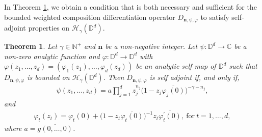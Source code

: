 \documentclass[12pt, reqno]{amsart}
\newtheorem{theorem}{Theorem}[section]
\theoremstyle{definition}
\theoremstyle{remark}
\numberwithin{equation}{section}
\newcommand{\mfn}{\mathbf n}
\begin{document}
 
 In Theorem \ref{Thm_2}, we obtain a condition that is both necessary and sufficient for the bounded weighted composition differentiation operator $D_{\mfn,\psi,\varphi}$ to satisfy self-adjoint properties on  $\mathcal{H}_\gamma(\mathbb{D}^d)$.
 \begin{theorem}\label{Thm_2}
 	Let $\gamma\in \mathbb{N}^+$ and $\mfn$ be a non-negative integer. Let $\psi: \mathbb{D}^d\longrightarrow \mathbb{C}$ be a non-zero analytic function and $\varphi: \mathbb{D}^d\longrightarrow \mathbb{D}^d$ with $\varphi(z_1,  \dots, z_d)=(\varphi_1(z_1), \dots, \varphi_d(z_d))$ be an analytic self map of $\mathbb{D}^d$ such that $D_{\mfn,\psi,\varphi}$ is bounded on $\mathcal{H}_\gamma(\mathbb{D}^d)$.
 	Then $D_{\mfn,\psi,\varphi}$ is self adjoint if, and only if,
 	\begin{gather*}
 	\psi(z_1, \dots, z_d)=a\prod_{j=1}^dz_j^{n_j}\Big(1-z_j\overline{\varphi_j(0)}\Big)^{-\gamma-n_j},
 	\end{gather*}
 	and 
 	\begin{gather*}
 	\varphi_t(z_t)=\varphi_t(0)+\Big(1-z_t\overline{\varphi_t(0)}\Big)^{-1}z_t\overline{\varphi_t^{\prime}(0)},~ \mbox{for}~ t=1, \dots, d,
 	\end{gather*}
 	where $a=\overline{g(0, \dots, 0)}$.
 \end{theorem}
\end{document}

